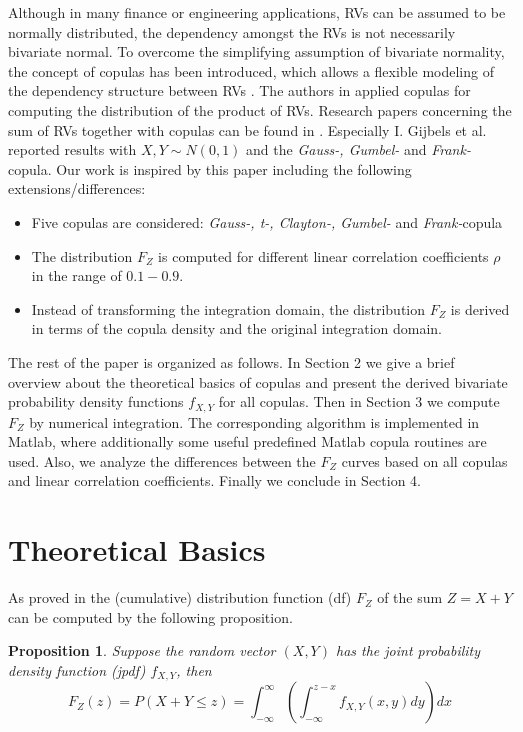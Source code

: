 \documentclass[a4paper]{article}
\begin{document}
Although in many finance or engineering applications, RVs can be assumed to be normally distributed, the dependency amongst the RVs is not necessarily bivariate normal. To overcome the simplifying assumption of bivariate normality, the concept of copulas has been introduced, which allows a flexible modeling of the dependency structure between RVs \cite{NEL06}. The authors in \cite{LPL19} applied copulas for computing the distribution of the product of RVs. Research papers concerning the sum of RVs together with copulas can be found in \cite{DG12, DG13, GH14}. Especially I. Gijbels et al. \cite{GH14} reported results with $X,Y \sim N(0,1)$ and the {\it Gauss-, Gumbel-} and {\it Frank-}copula. Our work is inspired by this paper including the following extensions/differences:

\begin{itemize}
	\item Five copulas are considered: {\it Gauss-, t-, Clayton-, Gumbel-} and {\it Frank-}copula 
	\item The distribution $F_Z$ is computed for different linear correlation coefficients $\rho$ in the range of $0.1 - 0.9$.
	\item Instead of transforming the integration domain, the distribution $F_Z$ is derived in terms of the copula density and the original integration domain.
\end{itemize}


The rest of the paper is organized as follows. In Section 2 we give a brief overview about the theoretical basics of copulas and present the derived bivariate probability density functions $f_{X,Y}$ for all copulas. Then in Section 3 we compute $F_Z$ by numerical integration. The corresponding algorithm is implemented in Matlab, where additionally some useful predefined Matlab copula routines \cite{MAT20} are used. Also, we analyze the differences between the $F_Z$ curves based on all copulas and linear correlation coefficients. Finally we conclude in Section 4.




\section{Theoretical Basics}
As proved in \cite{PP02} the (cumulative) distribution function (df) $F_Z$ of the sum $Z=X+Y$ can be computed by the following proposition. 

\newtheorem{proposition}{Proposition}
\begin{proposition}	
Suppose the random vector $(X,Y)$ has the joint probability density function (jpdf) $f_{X,Y}$, then
\begin{equation}
F_Z(z)=P(X+Y \le z)=\int_{-\infty}^{\infty}\left(\int_{-\infty}^{z-x}f_{X,Y}(x,y)dy\right)dx
\end{equation}
\end{proposition}
\end{document}
